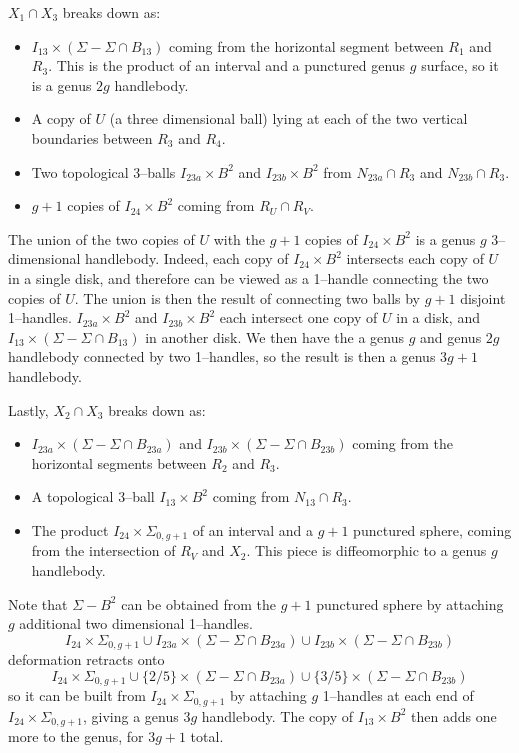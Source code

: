 \documentclass[12pt]{amsart}
\theoremstyle{definition}
\theoremstyle{remark}
\begin{document}
$X_1 \cap X_3$ breaks down as:

\begin{itemize}
\item $I_{13} \times (\Sigma - \Sigma \cap B_{13})$ coming from the horizontal segment between $R_1$ and $R_3$.  This is the product of an interval and a punctured genus $g$ surface, so it is a genus $2g$ handlebody.  
\item A copy of $U$ (a three dimensional ball) lying at each of the two vertical boundaries between $R_3$ and $R_4$.
\item Two topological 3--balls $I_{23a} \times B^2$ and $I_{23b} \times B^2$ from $N_{23a} \cap R_3$ and $N_{23b} \cap R_3$.
\item $g+1$ copies of $I_{24} \times B^2$ coming from $R_U \cap R_V$.
\end{itemize}


The union of the two copies of $U$ with the $g+1$ copies of $I_{24} \times B^2$ is a genus $g$ 3--dimensional handlebody.  Indeed, each copy of $I_{24} \times B^2$ intersects each copy of $U$ in a single disk, and therefore can be viewed as a 1--handle connecting the two copies of $U$.  The union is then the result of connecting two balls by $g+1$ disjoint 1--handles.  $I_{23a} \times B^2$ and $I_{23b} \times B^2$ each intersect one copy of $U$ in a disk, and $I_{13} \times (\Sigma - \Sigma \cap B_{13})$ in another disk.   We then have the a genus $g$ and genus $2g$ handlebody connected by two 1--handles, so the result is then a genus $3g+1$ handlebody.

Lastly, $X_2 \cap X_3$ breaks down as:
\begin{itemize}
\item $I_{23a} \times (\Sigma - \Sigma \cap B_{23a})$ and $I_{23b} \times (\Sigma - \Sigma \cap B_{23b})$ coming from the horizontal segments between $R_2$ and $R_3$.
\item A topological 3--ball $I_{13} \times B^2$ coming from $N_{13} \cap R_3$.
\item The product $I_{24} \times \Sigma_{0,g+1}$ of an interval and a $g+1$ punctured sphere, coming from the intersection of $R_V$ and $X_2$.  This piece is diffeomorphic to a genus $g$ handlebody.
\end{itemize}

Note that $\Sigma - B^2$ can be obtained from the $g+1$ punctured sphere by attaching $g$ additional two dimensional 1--handles.  $$I_{24} \times \Sigma_{0,g+1} \cup I_{23a} \times (\Sigma - \Sigma \cap B_{23a}) \cup I_{23b} \times (\Sigma - \Sigma \cap B_{23b})$$ deformation retracts onto $$I_{24} \times \Sigma_{0,g+1} \cup  \{2/5\} \times (\Sigma - \Sigma \cap B_{23a}) \cup  \{3/5\} \times (\Sigma - \Sigma \cap B_{23b}) $$ so it can be built from $I_{24} \times \Sigma_{0,g+1}$ by attaching $g$ 1--handles at each end of $I_{24} \times \Sigma_{0,g+1}$, giving a genus $3g$ handlebody.  The copy of $I_{13} \times B^2$ then adds one more to the genus, for $3g+1$ total.
\end{document}
